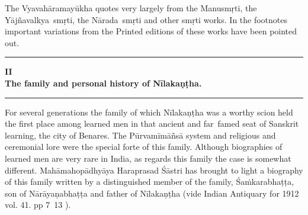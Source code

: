 \documentclass[11pt, openany]{book}
\begin{document}
The Vyavahāramayūkha quotes very largely from the Manusmṛti, the Yājñavalkya\textendash\ smṛti, the Nārada\textendash\ smṛti and other smṛti works. In the footnotes important variations from the Printed editions of these works have been pointed out.

\begin{center}
\rule{0.2\linewidth}{0.5pt}
\end{center}

\fancyhead[RE,LO]{\thepage}
\cfoot{}
\newpage
\renewcommand{\thepage}{\Roman{page}}
\setcounter{page}{5}


\begin{center}
\textbf{\large II}\\

\vspace{1mm}
\textbf{\large The family and personal history of Nīlakaṇṭha.}\\

\rule{0.2\linewidth}{0.5pt}
\end{center}

For several generations the family of which Nīlakaṇṭha was a worthy scion held the first place among learned men in that ancient and far\textendash\ famed seat of Sanskrit learning, the city of Benares. The Pūrvamīmāñsā system and religious and ceremonial lore were the special forte of this family. Although biographies of learned men are very rare in India, as regards this family the case is somewhat different. Mahāmahopādhyāya Haraprasad Śāstri has brought to light a biography of this family written by a distinguished member of the family, Śaṁkarabhaṭṭa, son of Nārāyaṇabhaṭṭa and father of Nīlakaṇṭha (vide Indian Antiquary for 1912 vol. 41. pp 7\textendash\ 13 ).
\end{document}
